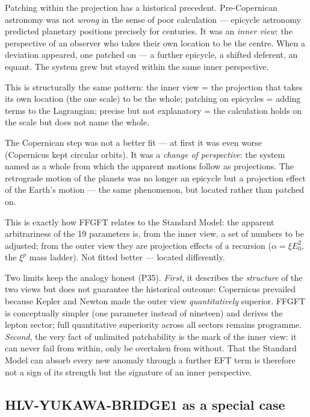 Patching within the projection has a historical precedent. Pre-Copernican
astronomy was not \emph{wrong} in the sense of poor calculation --- epicycle
astronomy predicted planetary positions precisely for centuries. It was an
\emph{inner view}: the perspective of an observer who takes their own location
to be the centre. When a deviation appeared, one patched on --- a further
epicycle, a shifted deferent, an equant. The system grew but stayed within the
same inner perspective.

This is structurally the same pattern: the inner view = the projection that
takes its own location (the one scale) to be the whole; patching on epicycles
= adding terms to the Lagrangian; precise but not explanatory = the
calculation holds on the scale but does not name the whole.

The Copernican step was not a better fit --- at first it was even worse
(Copernicus kept circular orbits). It was a \emph{change of perspective}: the
system named as a whole from which the apparent motions follow as projections.
The retrograde motion of the planets was no longer an epicycle but a projection
effect of the Earth's motion --- the same phenomenon, but located rather than
patched on.

This is exactly how FFGFT relates to the Standard Model: the apparent
arbitrariness of the 19 parameters is, from the inner view, a set of numbers to
be adjusted; from the outer view they are projection effects of a recursion
($\alpha = \xi E_0^2$, the $\xi^p$ mass ladder). Not fitted better --- located
differently.

Two limits keep the analogy honest (P35). \emph{First}, it describes the
\emph{structure} of the two views but does not guarantee the historical
outcome: Copernicus prevailed because Kepler and Newton made the outer view
\emph{quantitatively} superior. FFGFT is conceptually simpler (one parameter
instead of nineteen) and derives the lepton sector; full quantitative
superiority across all sectors remains programme. \emph{Second}, the very fact
of unlimited patchability is the mark of the inner view: it can never fail from
within, only be overtaken from without. That the Standard Model can absorb
every new anomaly through a further EFT term is therefore not a sign of its
strength but the signature of an inner perspective.

\subsection*{HLV-YUKAWA-BRIDGE1 as a special case}

